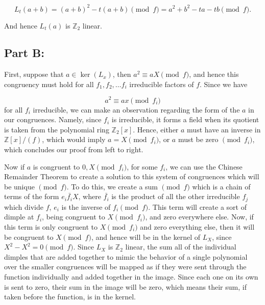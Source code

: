 \documentclass[12pt]{article}
\theoremstyle{moo}
\def\zz{{\mathbb Z}}
\begin{document}
\[
L_t(a+b) = \left(a+b\right)^2 - t \left(a + b \right) \pmod{f} = a^2 + b^2 - ta - tb \pmod{f}.
\]

And hence $L_t(a)$ is $\zz_2$ linear.

\subsection*{Part B:}

First, suppose that $ a \in \ker(L_x)$, then $a^2 \equiv aX \pmod{f}$, and hence this congruency must hold for all $f_1,f_2, \ldots f_i$ irreducible factors of $f$. Since we have 

\[
    a^2 \equiv ax \pmod{f_i}
\]
for all $f_i$ irreducible, we can make an observation regarding the form of the $a$ in our congruences. Namely, since $f_i$ is irreducible, it forms a field when its quotient is taken from the polynomial ring $\zz_2 \left[x\right]$. Hence, either $a$ must have an inverse in $\zz \left[x\right]/(f)$, which would imply $a = X \pmod{f_i}$, or $a$ must be zero $\pmod{f_i}$, which concludes our proof from left to right.

Now if $a$ is congruent to $0,X \pmod{f_i}$, for some $f_i$, we can use the Chinese Remainder Theorem to create a solution to this system of congruences which will be unique $\pmod{f}$. To do this, we create a sum $\pmod{f}$ which is a chain of terms of the form $e_i\bar{f_i}X$, where $\bar{f_i}$ is the product of all the other irreducible $f_j$ which divide $f$, $e_i$ is the inverse of $f_i \pmod {f}$. This term will create a sort of dimple at $f_i$, being congruent to $X \pmod{f_i}$, and zero everywhere else. Now, if this term is only congruent to $X \pmod{f_i}$ and zero everything else, then it will be congruent to $X \pmod {f}$, and hence will be in the kernel of $L_X$, since $X^2 - X^2 = 0 \pmod{f}$. Since $L_X$ is $\zz_2$ linear, the sum all of the individual dimples that are added together to mimic the behavior of a single polynomial over the smaller congruences will be mapped as if they were sent through the function individually and added together in the image. Since each one on its own is sent to zero, their sum in the image will be zero, which means their sum, if taken before the function, is in the kernel.
\end{document}
